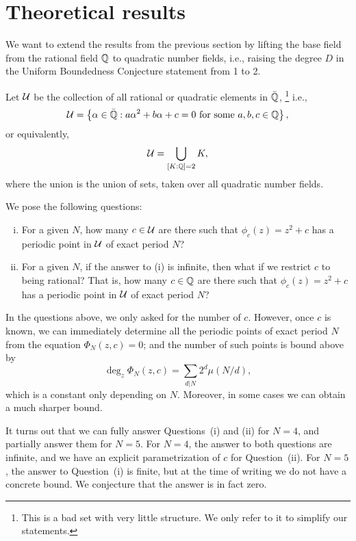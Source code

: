 \section{Theoretical results}

We want to extend the results from the previous section by lifting the
base field from the rational field $\mathbb{Q}$ to quadratic number fields,
i.e., raising the degree $D$ in the Uniform Boundedness Conjecture
statement from 1 to 2.

Let $\mathcal{U}$ be the collection of all rational or quadratic elements in
$\bar{\mathbb{Q}}$,%
\footnote{This is a bad set with very little structure. We only refer
  to it to simplify our statements.}  i.e.,
\[
\mathcal{U} = \left\{\alpha \in \bar{\mathbb{Q}}: \text{$a \alpha^2 + b \alpha + c = 0$
    for some $a, b, c \in \mathbb{Q}$}\right\},
\]
or equivalently,
\[
\mathcal{U} = \bigcup_{[K : \mathbb{Q}] = 2}K,
\]
where the union is the union of sets, taken over all quadratic number
fields.

We pose the following questions:
\begin{enumerate}[(i)]
\item For a given $N$, how many $c \in \mathcal{U}$ are there such that
  $\phi_c(z) = z^2 + c$ has a periodic point in $\mathcal{U}$ of exact period
  $N$?

\item For a given $N$, if the answer to (i) is infinite, then what if
  we restrict $c$ to being rational? That is, how many $c \in \mathbb{Q}$ are
  there such that $\phi_c(z) = z^2 + c$ has a periodic point in $\mathcal{U}$
  of exact period $N$?
\end{enumerate}

\begin{remark}
  In the questions above, we only asked for the number of
  $c$. However, once $c$ is known, we can immediately determine all
  the periodic points of exact period $N$ from the equation $\Phi_N(z,
  c) = 0$; and the number of such points is bound above by
  \[
  \deg_z \Phi_N(z, c) = \sum_{d|N}2^d \mu(N/d),
  \]
  which is a constant only depending on $N$. Moreover,
  in some cases we can obtain a much sharper bound.
\end{remark}

It turns out that we can fully answer Questions~(i) and (ii) for $N =
4$, and partially answer them for $N = 5$. For $N = 4$, the answer to
both questions are infinite, and we have an explicit parametrization
of $c$ for Question~(ii). For $N = 5$, the answer to Question~(i) is
finite, but at the time of writing we do not have a concrete bound. We
conjecture that the answer is in fact zero.

